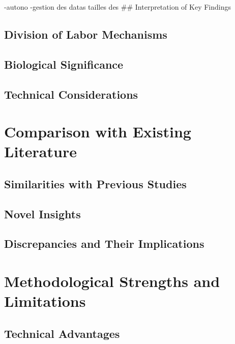 \documentclass[
  11pt,
  a4paper,
]{report}
\begin{document}
-autono -gestion des datas tailles des \#\# Interpretation of Key
Findings

\subsection{Division of Labor
Mechanisms}\label{division-of-labor-mechanisms}

\subsection{Biological Significance}\label{biological-significance}

\subsection{Technical Considerations}\label{technical-considerations}

\section{Comparison with Existing
Literature}\label{comparison-with-existing-literature}

\subsection{Similarities with Previous
Studies}\label{similarities-with-previous-studies}

\subsection{Novel Insights}\label{novel-insights}

\subsection{Discrepancies and Their
Implications}\label{discrepancies-and-their-implications}

\section{Methodological Strengths and
Limitations}\label{methodological-strengths-and-limitations}

\subsection{Technical Advantages}\label{technical-advantages}
\end{document}
